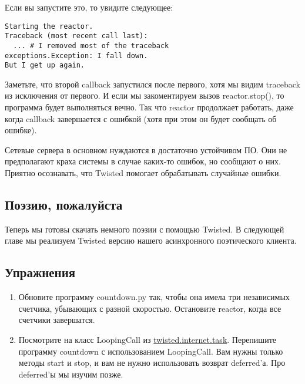 Если вы запустите это, то увидите следующее:

 \begin{verbatim}
Starting the reactor.
Traceback (most recent call last):
  ... # I removed most of the traceback
exceptions.Exception: I fall down.
But I get up again.
\end{verbatim} 


Заметьте, что второй callback запустился после первого, хотя 
мы видим traceback из исключения от первого. И если мы 
закоментируем вызов reactor.stop(), то программа будет 
выполняться вечно. Так что reactor продолжает работать, даже когда 
callback завершается с ошибкой (хотя при этом он будет сообщать об ошибке). 


Сетевые сервера в основном нуждаются в достаточно устойчивом ПО. 
Они не предполагают краха системы в случае каких-то ошибок, но 
сообщают о них. Приятно осознавать, что Twisted помогает обрабатывать 
случайные ошибки.


\subsection{Поэзию, пожалуйста}

Теперь мы готовы скачать немного поэзии с помощью Twisted. 
В следующей главе мы реализуем Twisted версию нашего 
асинхронного поэтического клиента.


\subsection{Упражнения}

\begin{enumerate}
\item Обновите программу countdown.py так, чтобы она имела три независимых 
счетчика, убывающих с разной скоростью. Остановите reactor, когда все 
счетчики завершатся.

\item Посмотрите на класс LoopingCall из
\href{http://twistedmatrix.com/trac/browser/tags/releases/twisted-8.2.0/twisted/internet/task.py}{twisted.internet.task}. 
Перепишите программу countdown с использованием LoopingCall. 
Вам нужны только методы start и 
stop, и вам не нужно использовать возврат deferred'а. 
Про deferred'ы мы изучим позже.
\end{enumerate}



